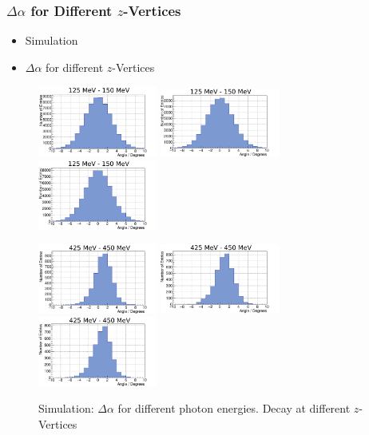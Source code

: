 \documentclass[slidestop,compress,mathserif]{beamer}
\begin{document}
\begin{frame}
	\frametitle{$\Delta \alpha$ for Different $z$-Vertices}
	\begin{itemize}
		\item Simulation
		\item $\Delta \alpha$ for different $z$-Vertices
	\end{itemize}

\begin{figure}
	\includegraphics[width=0.35\textwidth]{Pictures/20170205DiffOeffZVertex-4_125MeV}
	\includegraphics[width=0.35\textwidth]{Pictures/20170205DiffOeffZVertexUrsprung135MeV}	
	\includegraphics[width=0.35\textwidth]{Pictures/20170205DiffOeffZVertex+4_125MeV}	

	\includegraphics[width=0.35\textwidth]{Pictures/20170205DiffOeffZVertex-4_425MeV}
	\includegraphics[width=0.35\textwidth]{Pictures/20170205DiffOeffZVertexUrsprung425MeV}
	\includegraphics[width=0.35\textwidth]{Pictures/20170205DiffOeffZVertex+4_425MeV}	
	\caption{Simulation: $\Delta \alpha$ for different photon energies. Decay at different $z$-Vertices}
\end{figure}
	
\end{frame}
\end{document}

